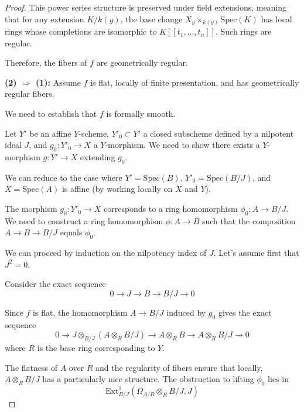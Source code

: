 \documentclass[12pt]{article}
\begin{document}
\begin{proof}
    \medskip
    \noindent This power series structure is preserved under field extensions, meaning that for any extension $K/k(y)$, the base change $X_y \times_{k(y)} \text{Spec}(K)$ has local rings whose completions are isomorphic to $K[[t_1, \ldots, t_n]]$. Such rings are regular.

    \medskip
    \noindent Therefore, the fibers of $f$ are geometrically regular.

    \medskip
    \noindent \textbf{(2) $\Rightarrow$ (1):} Assume $f$ is flat, locally of finite presentation, and has geometrically regular fibers.

    \medskip
    \noindent We need to establish that $f$ is formally smooth.

    \medskip
    \noindent Let $Y'$ be an affine $Y$-scheme, $Y'_0 \subset Y'$ a closed subscheme defined by a nilpotent ideal $J$, and $g_0: Y'_0 \to X$ a $Y$-morphism. We need to show there exists a $Y$-morphism $g: Y' \to X$ extending $g_0$.

    \medskip
    \noindent We can reduce to the case where $Y' = \text{Spec}(B)$, $Y'_0 = \text{Spec}(B/J)$, and $X = \text{Spec}(A)$ is affine (by working locally on $X$ and $Y$).

    \medskip
    \noindent The morphism $g_0: Y'_0 \to X$ corresponds to a ring homomorphism $\phi_0: A \to B/J$. We need to construct a ring homomorphism $\phi: A \to B$ such that the composition $A \to B \to B/J$ equals $\phi_0$.

    \medskip
    \noindent We can proceed by induction on the nilpotency index of $J$. Let's assume first that $J^2 = 0$.

    \medskip
    \noindent Consider the exact sequence
    \begin{equation}
        0 \to J \to B \to B/J \to 0
    \end{equation}

    \noindent Since $f$ is flat, the homomorphism $A \to B/J$ induced by $g_0$ gives the exact sequence
    \begin{equation}
        0 \to J \otimes_{B/J} (A \otimes_R B/J) \to A \otimes_R B \to A \otimes_R B/J \to 0
    \end{equation}
    where $R$ is the base ring corresponding to $Y$.

    \medskip
    \noindent The flatness of $A$ over $R$ and the regularity of fibers ensure that locally, $A \otimes_R B/J$ has a particularly nice structure. The obstruction to lifting $\phi_0$ lies in
    \begin{equation}
        \text{Ext}^1_{B/J}(\Omega_{A/R} \otimes_R B/J, J)
    \end{equation}


\end{proof}
\end{document}
